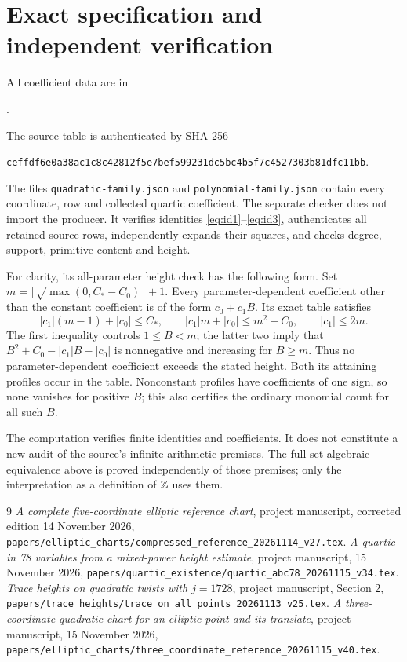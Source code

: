 \documentclass[11pt,a4paper]{article}
\theoremstyle{remark}\newtheorem{remark}[theorem]{Remark}
\begin{document}
\section{Exact specification and independent verification}
All coefficient data are in
\begin{center}\small
{}.
\end{center}
The source table is authenticated by SHA-256
\begin{center}\small
\texttt{ceffdf6e0a38ac1c8c42812f5e7bef599231dc5bc4b5f7c4527303b81dfc11bb}.
\end{center}
The files \texttt{quadratic-family.json} and
\texttt{polynomial-family.json} contain every coordinate, row and
collected quartic coefficient. The separate checker does not import the
producer. It verifies identities \eqref{eq:id1}--\eqref{eq:id3},
authenticates all retained source rows, independently expands their
squares, and checks degree, support, primitive content and height.

For clarity, its all-parameter height check has the following form.
Set $m=\lfloor\sqrt{\max(0,C_*-C_0)}\rfloor+1$.
Every parameter-dependent coefficient other than the constant coefficient
is of the form $c_0+c_1B$. Its exact table satisfies
\[
 |c_1|(m-1)+|c_0|\le C_*,\qquad
 |c_1|m+|c_0|\le m^2+C_0,\qquad |c_1|\le2m.
\]
The first inequality controls $1\le B<m$; the latter two imply that
$B^2+C_0-|c_1|B-|c_0|$ is nonnegative and increasing for $B\ge m$.
Thus no parameter-dependent coefficient exceeds the stated height.
Both its attaining profiles occur in the table. Nonconstant profiles
have coefficients of one sign, so none vanishes for positive $B$;
this also certifies the ordinary monomial count for all such $B$.

The computation verifies finite identities and coefficients. It does not
constitute a new audit of the source's infinite arithmetic premises.
The full-set algebraic equivalence above is proved independently of
those premises; only the interpretation as a definition of $\mathbb Z$ uses them.

\begin{thebibliography}{9}
\emph{A complete five-coordinate elliptic reference chart},
project manuscript, corrected edition 14 November 2026,
\nolinkurl{papers/elliptic_charts/compressed_reference_20261114_v27.tex}.
\emph{A quartic in 78 variables from a mixed-power height estimate},
project manuscript, 15 November 2026,
\nolinkurl{papers/quartic_existence/quartic_abc78_20261115_v34.tex}.
\emph{Trace heights on quadratic twists with $j=1728$},
project manuscript, Section 2,
\nolinkurl{papers/trace_heights/trace_on_all_points_20261113_v25.tex}.
\emph{A three-coordinate quadratic chart for an elliptic
point and its translate}, project manuscript, 15 November 2026,
\nolinkurl{papers/elliptic_charts/three_coordinate_reference_20261115_v40.tex}.
\end{thebibliography}
\end{document}
